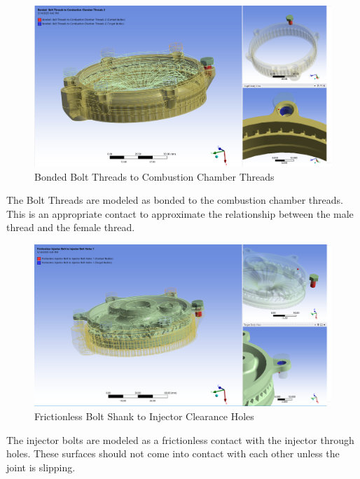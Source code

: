 \begin{figure}
    \centering
    \includegraphics[width=1\linewidth]{Images/Bonded Bolt Threads to Combustion Chamber Threads.png}
    \caption{Bonded Bolt Threads to Combustion Chamber Threads}
    \label{fig:Bonded Bolt Threads to Combustion Chamber Threads}
\end{figure}
The Bolt Threads are modeled as bonded to the combustion chamber threads. This is an appropriate contact to approximate the relationship between the male thread and the female thread. 

\begin{figure}
    \centering
    \includegraphics[width=1\linewidth]{Images/Frictionless Injector Bolt to Injector Bolt Holes.png}
    \caption{Frictionless Bolt Shank to Injector Clearance Holes}
    \label{fig:Frictionless Bolt Shank to Injector Clearance Holes}
\end{figure}
The injector bolts are modeled as a frictionless contact with the injector through holes. These surfaces should not come into contact with each other unless the joint is slipping. 


